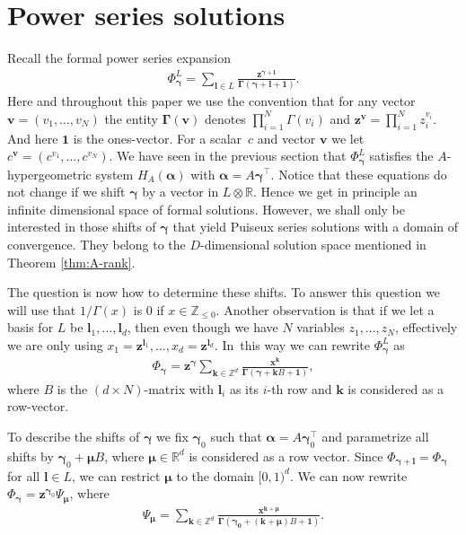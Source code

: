 \documentclass[pdftex]{sigma}
\numberwithin{equation}{section}
\begin{document}
\section{Power series solutions}
\label{chap-power}
Recall the formal power series expansion
\begin{gather*}\Phi_{\bm{\gamma}}^L =
\sum_{\bm{l}\in L} \frac{\bm{z}^{\bm{\gamma} + \bm{l}}}{\bm{\Gamma}(\bm{\gamma} + \bm{l} + \bm{1}) }. %
\end{gather*}
Here and throughout this paper we use the convention that for any vector $\bm{v} = \left(v_1,\dots,v_N\right)$ the entity $\bm{\Gamma}(\bm{v})$ denotes $\prod_{i=1}^N \Gamma(v_i)$ and $\bm{z}^{\bm{v}} = \prod_{i=1}^N z_i^{v_i}$. And here $\bm{1}$ is the ones-vector. For a scalar~$c$ and vector $\bm{v}$ we let $c^{\bm{v}} = \left(c^{v_1},\dots,c^{v_N}\right)$.
We have seen in the previous section that $\Phi_{\bm{\gamma}}^L$ satisfies the $A$-hypergeometric system
$H_A(\bm\alpha)$ with $\bm\alpha=A\bm\gamma^\intercal$. Notice that these equations do
not change if we shift $\bm\gamma$ by a vector in $L\otimes\mathbb{R}$. Hence we get
in principle an infinite dimensional space of formal solutions. However, we shall only
be interested in those shifts of $\bm\gamma$ that yield Puiseux series solutions with
a domain of convergence. They belong to the $D$-dimensional solution space mentioned in
Theorem \ref{thm:A-rank}.

The question is now how to determine these shifts.
To answer this question we will use that $1/\Gamma(x)$ is $0$ if $x \in \mathbb{Z}_{\leq 0}$. Another observation is that if we let a basis for $L$ be $\bm{l}_1,\dots,\bm{l}_d$, then even though we have $N$ variables $z_1,\dots,z_N$, effectively we are only using
$x_1 = \bm{z}^{\bm{l}_1},\dots,x_d = \bm{z}^{\bm{l}_d}$. In~this way we can rewrite $\Phi_{\bm{\gamma}}^L$ as
\begin{gather*}
\Phi_{\bm{\gamma}} = \bm{z}^{\bm{\gamma}}\sum_{\bm{k} \in \mathbb{Z}^d} \frac{\bm{x}^{\bm{k}}}{\bm{\Gamma}(\bm{\gamma} + \bm{k}B + \bm{1}) },
\end{gather*}
where $B$ is the $(d\times N)$-matrix with $\bm{l}_i$ as its $i$-th row and $\bm{k}$ is considered as a row-vector.

To describe the shifts of $\bm\gamma$ we fix $\bm\gamma_0$ such that $\bm\alpha
=A\bm\gamma_0^{\intercal}$ and parametrize all shifts by $\bm\gamma_0+\bm\mu B$, where $\bm\mu
\in\mathbb{R}^d$ is considered as a row vector. Since $\Phi_{\bm\gamma+\bm{l}}=\Phi_{\bm\gamma}$
for all $\bm{l}\in L$, we can restrict $\bm\mu$ to the domain $[0,1)^d$. We can
now rewrite $\Phi_{\bm\gamma}=\bm{z}^{\bm\gamma_0}\Psi_{\bm\mu}$, where
\begin{gather*}
\Psi_{\bm\mu}=\sum_{\bm{k}\in\mathbb{Z}^d}\frac{\bm{x}^{\bm{k}+\bm\mu}}
{\bm{\Gamma}(\bm{\gamma_0} + (\bm{k}+\bm\mu)B + \bm{1}) }.
\end{gather*}
\end{document}
